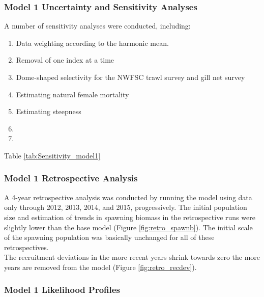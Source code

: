 \documentclass[12pt,]{article}
\begin{document}
\subsubsection{Model 1 Uncertainty and Sensitivity
Analyses}\label{model-1-uncertainty-and-sensitivity-analyses}

A number of sensitivity analyses were conducted, including:

\begin{enumerate}

  \item Data weighting according to the harmonic mean.
  
  \item Removal of one index at a time
  
  \item Dome-shaped selectivity for the NWFSC trawl survey and gill net survey
  
  \item Estimating natural female mortality
  
  \item Estimating steepness
  
  \item   
  \item 
  
  
\end{enumerate}

Table \ref{tab:Sensitivity_model1}

\subsubsection{Model 1 Retrospective
Analysis}\label{model-1-retrospective-analysis}

A 4-year retrospective analysis was conducted by running the model using
data only through 2012, 2013, 2014, and 2015, progressively. The initial
population size and estimation of trends in spawning biomass in the
retrospective runs were slightly lower than the base model (Figure
\ref{fig:retro_spawnb}). The initial scale of the spawning population
was basically unchanged for all of these retrospectives.\\
The recruitment deviations in the more recent years shrink towards zero
the more years are removed from the model (Figure
\ref{fig:retro_recdev}).

\subsubsection{Model 1 Likelihood
Profiles}\label{model-1-likelihood-profiles}
\end{document}
